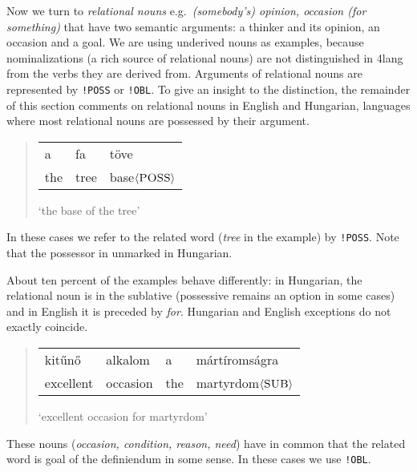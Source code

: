 \documentclass[a4paper,10pt]{article}
\begin{document}
Now we turn to \emph{relational nouns} e.g.\ \emph{(somebody's) opinion,
  occasion (for something)} that have two semantic arguments: a thinker and
its opinion, an occasion and a goal. We are using underived nouns as examples,
because nominalizations (a rich source of relational nouns) are not
distinguished in 4lang from the verbs they are derived from.  Arguments of
relational nouns are represented by \texttt{!POSS} or \texttt{!OBL}. To give
an insight to the distinction, the remainder of this section comments on
relational nouns in English and Hungarian, languages where most {relational
  nouns} are possessed by their argument.
\begin{quote}
 \begin{tabular}{lll}
  a &fa &töve
 \\the &tree &base$\langle\textsc{POSS}\rangle$
 \end{tabular}
 
 `the base of the tree'
\end{quote}
In these cases we refer to the related word (\emph{tree} in the example) by
\texttt{!POSS}. Note that the possessor in unmarked in Hungarian.
 
About ten percent of the examples behave differently: in Hungarian, the
relational noun is in the sublative (possessive remains an option in some
cases) and in English it is preceded by \emph{for}. Hungarian and English
exceptions do not exactly coincide.
\begin{quote}
 \begin{tabular}{llll}
  kitűnő		& alkalom	& a & mártíromságra
 \\ excellent	& occasion 	& the & martyrdom$\langle\textsc{SUB}\rangle$
 \end{tabular}
 
 `excellent occasion for martyrdom'
\end{quote}
These nouns (\emph{occasion, condition, reason, need}) have in common that the related word is goal of the definiendum in some sense. In these cases we use \texttt{!OBL}.
\end{document}
